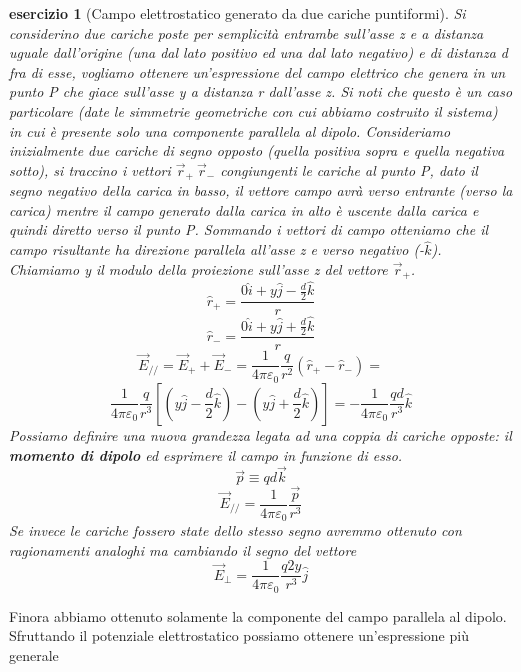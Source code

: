 \documentclass[10pt,a4paper]{article}
\newtheorem{esercizio}{esercizio}
\begin{document}
\begin{esercizio}[Campo elettrostatico generato da due cariche puntiformi]
	Si considerino due cariche poste per semplicità entrambe sull'asse z e a distanza uguale dall'origine (una dal lato positivo ed una dal lato negativo) e di distanza d fra di esse, vogliamo ottenere un'espressione del campo elettrico che genera in un punto P che giace sull'asse y a distanza r dall'asse z. Si noti che questo è un caso particolare (date le simmetrie geometriche con cui abbiamo costruito il sistema) in cui è presente solo una componente parallela al dipolo. Consideriamo inizialmente due cariche di segno opposto (quella positiva sopra e quella negativa sotto), si traccino i vettori \(\vec{r}_+ \ \vec{r}_- \) congiungenti le cariche al punto P, dato il segno negativo della carica in basso, il vettore campo avrà verso entrante (verso la carica) mentre il campo generato dalla carica in alto è uscente dalla carica e quindi diretto verso il punto P. Sommando i vettori di campo otteniamo che il campo risultante ha direzione parallela all'asse z e verso negativo (-$\hat{k}$). Chiamiamo y il modulo della proiezione sull'asse z del vettore $\vec{r}_+$.
	\[\hat{r}_+ =\frac{ 0\hat{i}+y \hat{j}-\frac{d}{2}\hat{k}}{r}\]
	\[\hat{r}_- = \frac{0\hat{i}+y \hat{j}+\frac{d}{2}\hat{k}}{r}\]
	\[\vec{E}_{//} = \vec{E}_{+} + \vec{E}_{-} = \frac{1}{4\pi\varepsilon_0}\frac{q}{r^2}\left(\hat{r}_+-\hat{r}_-\right)=\]
	\[\frac{1}{4\pi\varepsilon_0}\frac{q}{r^3}\left[(y\hat{j}-\frac{d}{2}\hat{k})-(y\hat{j}+\frac{d}{2}\hat{k})\right]= -\frac{1}{4\pi\varepsilon_0}\frac{q d}{r^3}\hat{k}\]
	Possiamo definire una nuova grandezza legata ad una coppia di cariche opposte: il \textbf{momento di dipolo} ed esprimere il campo in funzione di esso.
	\[\vec{p} \equiv qd\vec{k}\]
	\[\vec{E}_{//} = \frac{1}{4\pi\varepsilon_0}\frac{\vec{p}}{r^3}\]
	Se invece le cariche fossero state dello stesso segno avremmo ottenuto con ragionamenti analoghi ma cambiando il segno del vettore
	\[\vec{E}_{\perp} = \frac{1}{4\pi\varepsilon_0}\frac{q2y}{r^3}\hat{j}\]
\end{esercizio}
Finora abbiamo ottenuto solamente la componente del campo parallela al dipolo. Sfruttando il potenziale elettrostatico possiamo ottenere un'espressione più generale
\end{document}
